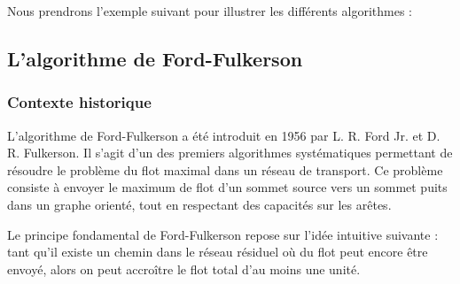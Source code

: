 \documentclass[a4paper]{article}
\begin{document}
Nous prendrons l'exemple suivant pour illustrer les différents algorithmes :

\begin{center}
\end{center}


\subsection{L'algorithme de Ford-Fulkerson}

\subsubsection{Contexte historique}

L’algorithme de Ford-Fulkerson a été introduit en 1956 par L. R. Ford Jr. et D. R. Fulkerson. Il s’agit d’un des premiers algorithmes systématiques permettant de résoudre le problème du flot maximal dans un réseau de transport. Ce problème consiste à envoyer le maximum de \og{}flot\fg{} d’un sommet source vers un sommet puits dans un graphe orienté, tout en respectant des capacités sur les arêtes\cite{Ford_Fulkerson_1956}.

Le principe fondamental de Ford-Fulkerson repose sur l’idée intuitive suivante : tant qu’il existe un chemin dans le réseau résiduel où du flot peut encore être envoyé, alors on peut accroître le flot total d'au moins une unité.
\end{document}
